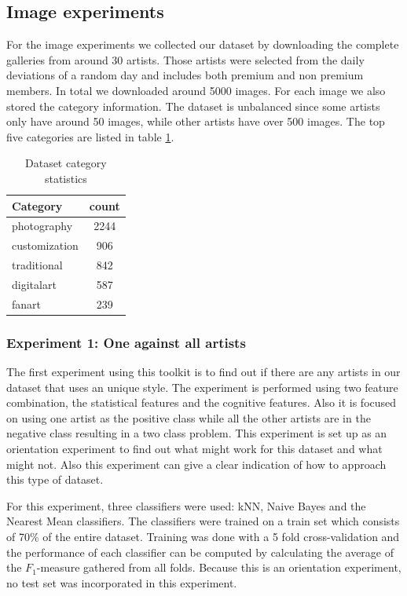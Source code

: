 \subsection{Image experiments}
For the image experiments we collected our dataset by downloading the complete galleries from around 30 artists.
Those artists were selected from the daily deviations of a random day and includes both premium and non premium members.
In total we downloaded around 5000 images. 
For each image we also stored the category information.
The dataset is unbalanced since some artists only have around 50 images, while other artists have over 500 images.
The top five categories are listed in table \ref{datasetstats}.

\begin{table}[htb]
    \centering
    \begin{tabular}
        { | l | c | } 
        \hline
        Category & count \\
        \hline
        photography & 2244 \\ 
        customization & 906 \\ 
        traditional & 842 \\ 
        digitalart & 587 \\ 
        fanart & 239 \\ 
        \hline 
    \end{tabular}
    \caption{Dataset category statistics}
    \label{datasetstats}
\end{table}

\subsubsection{Experiment 1: One against all artists}

The first experiment using this toolkit is to find out if there are any artists in our dataset that uses an unique style.
The experiment is performed using two feature combination, the statistical features and the cognitive features.
Also it is focused on using one artist as the positive class while all the other artists are in the negative class resulting in a two class problem.
This experiment is set up as an orientation experiment to find out what might work for this dataset and what might not.
Also this experiment can give a clear indication of how to approach this type of dataset.

For this experiment, three classifiers were used: kNN, Naive Bayes and the Nearest Mean classifiers.
The classifiers were trained on a train set which consists of 70\% of the entire dataset.
Training was done with a 5 fold cross-validation and the performance of each classifier can be computed by calculating the average of the $F_1$-measure gathered from all folds.
Because this is an orientation experiment, no test set was incorporated in this experiment.


